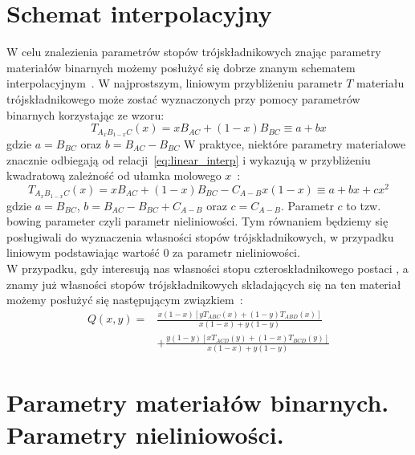 \documentclass[12pt,openany,a4paper]{book}
\begin{document}
\section{Schemat interpolacyjny}\label{sec:interpolation}
W celu znalezienia parametrów stopów trójskładnikowych znając parametry materiałów binarnych
	możemy posłużyć się dobrze znanym schematem interpolacyjnym~\autocite{Adachi1985}. W najprostszym, liniowym
	przybliżeniu parametr \(T\) materiału trójskładnikowego  może zostać wyznaczonych przy pomocy
	parametrów binarnych korzystając ze wzoru:
	\begin{equation}
		T_{A_x B_{1-x}C}(x) = x B_{AC} + (1-x)B_{BC} \equiv a + bx
		\label{eq:linear_interp}
	\end{equation}
	gdzie \(a = B_{BC}\) oraz \(b = B_{AC}-B_{BC}\)
	W praktyce, niektóre parametry materiałowe znacznie odbiegają od
	relacji~\eqref{eq:linear_interp} i wykazują w przybliżeniu kwadratową
	zależność od ułamka molowego \(x\)~\autocite{Adachi2017}:
	\begin{equation}
		T_{A_x B_{1-x}C}(x) = x B_{AC} + (1-x)B_{BC}  - C_{A-B}x(1-x)\equiv a + bx+cx^2
		\label{eq:quadratic}
	\end{equation} 
	gdzie \(a = B_{BC}\), \(b = B_{AC} - B_{BC}+C_{A-B}\) oraz \(c = C_{A-B}\). Parametr \(c\)
	to tzw. bowing parameter czyli parametr nieliniowości. Tym równaniem będziemy się posługiwali
	do wyznaczenia własności stopów trójskładnikowych, w przypadku liniowym podstawiając
	wartość \(0\) za parametr nieliniowości.\\

	W przypadku, gdy interesują nas własności stopu czteroskładnikowego postaci
	, a znamy już własności stopów trójskładnikowych
	składających się na ten materiał możemy posłużyć się następującym związkiem~\autocite{Adachi2017}:
	\begin{align}
		Q(x,y) = & \frac{x(1-x)\left[y T_{ABC}(x) + (1-y)T_{ABD}(x)\right]}{
			x(1-x) + y(1-y)} \\
			&+ \frac{y(1-y)\left[x T_{ACD}(y) + (1-x)T_{BCD}(y)\right]}{x(1-x) + y(1-y)}
			\label{eq:quaternary} 
	\end{align}

\section{Parametry materiałów binarnych. Parametry nieliniowości.}\label{sec:binary_params}
\end{document}
